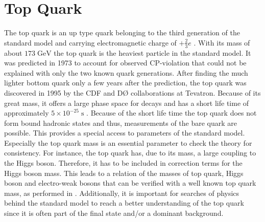 	
\section{Top Quark}
	The top quark is an up type quark belonging to the third generation of the standard model and carrying electromagnetic charge of $+\frac{2}{3}e$ \cite{pdg2016}. With its mass of about $173\;\text{GeV}$ the top quark is the heaviest particle in the standard model. It was predicted in 1973 \cite{topPredict} to account for observed CP-violation that could not be explained with only the two known quark generations. After finding the much lighter bottom quark only a few years after the prediction, the top quark was discovered in 1995 by the CDF \cite{topCDF} and D\O{} \cite{topD0} collaborations at Tevatron. Because of its great mass, it offers a large phase space for decays and has a short life time of approximately $5 \times 10^{-25}\;\text{s}$ \cite{pdg2016}. Because of the short life time the top quark does not form bound hadronic states and thus, measurements of the bare quark are possible. This provides a special access to parameters of the standard model. Especially the top quark mass is an essential parameter to check the theory for consistency. For instance, the top quark has, due to its mass, a large coupling to the Higgs boson. Therefore, it has to be included in correction terms for the Higgs boson mass. This leads to a relation of the masses of top quark, Higgs boson and electro-weak bosons that can be verified with a well known top quark mass, as performed in \cite{ewfit}. Additionally, it is important for searches of physics behind the standard model to reach a better understanding of the top quark since it is often part of the final state and/or a dominant background. 
